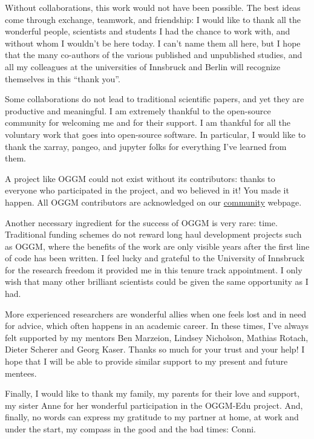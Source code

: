 Without collaborations, this work would not have been possible.
The best ideas come through exchange, teamwork, and friendship: I would like to
thank all the wonderful people, scientists and students I had the chance
to work with, and without whom I wouldn’t be here today. I can’t name them all here,
but I hope that the many co-authors of the various published and unpublished studies,
and all my colleagues at the universities of Innsbruck and Berlin will recognize themselves in this “thank you”.

Some collaborations do not lead to traditional scientific papers, and yet they
are productive and meaningful. I am extremely thankful
to the open-source community for welcoming me and for their support. I am thankful
for all the voluntary work that goes into open-source software. In particular,
I would like to thank the xarray, pangeo, and jupyter folks for everything
I’ve learned from them.

A project like OGGM could not exist without its contributors: thanks to everyone
who participated in the project, and wo believed in it! You made it happen.
All OGGM contributors are acknowledged on our \href{https://oggm.org/community}{community} webpage.

Another necessary ingredient for the success of OGGM is very rare: time.
Traditional funding schemes do not reward long haul development projects such as OGGM, where the benefits
of the work are only visible years after the first line of code has been written. I feel lucky and grateful
to the University of Innsbruck for the research freedom it provided me in this tenure track appointment.
I only wish that many other brilliant scientists could be given the same opportunity as I had.

More experienced researchers are wonderful allies when one feels lost and in need for advice,
which often happens in an academic career.
In these times, I’ve always felt supported by my mentors Ben Marzeion, Lindsey Nicholson,
Mathias Rotach, Dieter Scherer and Georg Kaser. Thanks so much for your trust and your help!
I hope that I will be able to provide similar support to my present and future mentees.

Finally, I would like to thank my family, my parents for their love and support, my sister Anne for her wonderful
participation in the OGGM-Edu project. And, finally, no words can express my gratitude to my partner
at home, at work and under the start, my compass in the good and the bad times: Conni.
